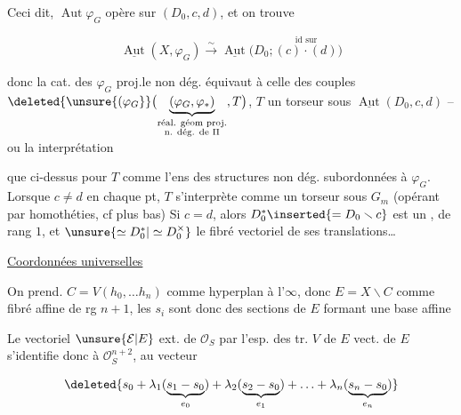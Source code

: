 Ceci dit, $\operatorname{Aut}\varphi_G$ opère sur $(D_0,c,d)$, et on trouve

\[
\underline{\operatorname{Aut}}(X,\varphi_G)\xrightarrow{\sim}
\underline{\operatorname{Aut}}\bigl(D_0;\overset{\text{id sur}}{(c)\cdot(d)}\bigr)
\]

donc la cat. des $\varphi_G$ proj.le non dég. équivaut à celle des couples $\deleted{\unsure{(\varphi_G}}\bigl(\underbrace{(\varphi_G,\varphi_*)}_{\substack{\text{réal. géom proj.}\\\text{n. dég. de }\Pi}},T\bigr)$, $T$ un torseur sous $\underline{\operatorname{Aut}}(D_0,c,d)$ -- ou la  interprétation


que ci-dessus pour $T$ comme l'ens des structures  non dég. subordonnées à $\varphi_G$. Lorsque $c\ne d$ en chaque pt, $T$ s'interprète comme un torseur sous $G_m$ (opérant par homothéties, cf plus bas) Si $c=d$, alors $D_0^*\inserted{=D_0\smallsetminus c}$ est un ,   de rang $1$,  et $\unsure{\simeq D_0^*|\simeq D_0^\times}$ le fibré vectoriel  de ses translations\ldots


\uline{Coordonnées universelles} 

On prend. $C=V(h_0,\ldots h_n)$ comme hyperplan à l'$\infty$,  donc $E=X\smallsetminus C$ comme fibré affine de rg $n+1$, les $s_i$ sont donc des sections de $E$ formant une base affine


Le vectoriel $\unsure{\mathcal E|E}$ ext. de $\mathcal O_S$ par  l'esp. des tr. $V$ de $E$   vect. de $E$ s'identifie donc à $\mathcal O_S^{n+2}$, au vecteur  

\[
\deleted{s_0+\lambda_1(\underbrace{s_1-s_0}_{e_0})+\lambda_2(\underbrace{s_2-s_0}_{e_1})+\ldots+\lambda_{n}(\underbrace{s_n-s_0}_{e_n})}
\]

